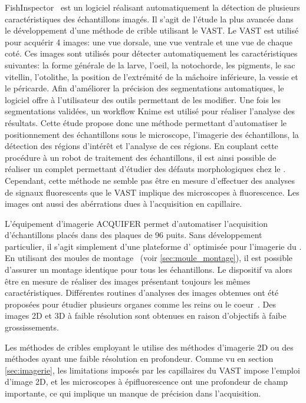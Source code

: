 \documentclass[\main/main.tex]{subfiles}
\begin{document}
FishInspector~\cite{teixid_2019} est un logiciel réalisant automatiquement la détection de plusieurs caractéristiques des échantillons imagés.
%
Il s'agit de l'étude la plus avancée dans le développement d'une méthode de crible utilisant le VAST.
%
Le VAST est utilisé pour acquérir 4 images: une vue dorsale, une vue ventrale et une vue de chaque coté.
%
Ces images sont utilisés pour détecter automatiquement les caractéristiques suivantes:
%
la forme générale de la larve,
l'oeil,
la notochorde,
les pigments,
le sac vitellin,
l'otolithe,
la position de l'extrémité de la mâchoire inférieure,
la vessie et le péricarde.
%
Afin d'améliorer la précision des segmentations automatiques,
le logiciel offre à l'utilisateur des outils permettant de les modifier.
%
Une fois les segmentations validées, un workflow Knime est utilisé pour réaliser l'analyse des résultats.
%
Cette étude propose donc une méthode permettant d'automatiser le positionnement des échantillons sous le microscope, l'imagerie des échantillons, la détection des régions d'intérêt et l'analyse de ces régions.
%
En couplant cette procédure à un robot de traitement des échantillons, il est ainsi possible de réaliser un \hcs{} complet permettant d'étudier des défauts morphologiques chez le \pz{}.
%
Cependant, cette méthode ne semble pas être en mesure d'effectuer des analyses de signaux fluorescents que le VAST implique des microscopes à fluorescence. Les images ont aussi des abérrations dues à l'acquisition en capillaire.

%
L'équipement d'imagerie ACQUIFER permet d'automatiser l'acquisition d'échantillons placés dans des plaques de 96 puits.
%
Sans développement particulier, il s'agit simplement d'une plateforme d'\hti{} optimisée pour l'imagerie du \pz{}.
%
En utilisant des moules de montage~\cite{wittbrodt_2014} (voir \autoref{sec:moule_montage}), il est possible d'assurer un montage identique pour tous les échantillons.
%
Le dispositif va alors être en mesure de réaliser des images présentant toujours les mêmes caractéristiques.
%
Différentes routines d'analyses des images obtenues ont été proposées pour étudier plusieurs organes comme les reins ou le coeur~\cite{westhoff_2020, steenbergen_2020, pandey_2019}. Des images 2D et 3D à faible résolution sont obtenues en raison d'objectifs à faibe grossissements.

%
Les méthodes de cribles employant le \pz{} utilise des méthodes d'imagerie 2D ou des méthodes ayant une faible résolution en profondeur.
%
Comme vu en section \ref{sec:imagerie}, les limitations imposés par les capillaires du VAST impose l'emploi d'image 2D, et les microscopes à épifluorescence ont une profondeur de champ importante, ce qui implique un manque de précision dans l'acquisition.
\end{document}

